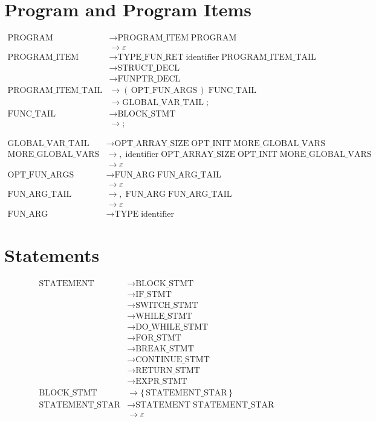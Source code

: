 
\section{Program and Program Items}
\begin{align*}
\text{PROGRAM}
  &\to \text{PROGRAM\_ITEM}\;\text{PROGRAM}\\
  &\to \varepsilon\\[6pt]
\text{PROGRAM\_ITEM}
  &\to \text{TYPE\_FUN\_RET}\;\text{identifier}\;\text{PROGRAM\_ITEM\_TAIL}\\
  &\to \text{STRUCT\_DECL}\\
  &\to \text{FUNPTR\_DECL}\\[6pt]
\text{PROGRAM\_ITEM\_TAIL}
  &\to (\,\text{OPT\_FUN\_ARGS}\,)\;\text{FUNC\_TAIL}\\
  &\to \text{GLOBAL\_VAR\_TAIL}\; ;\\[6pt]
\text{FUNC\_TAIL}
  &\to \text{BLOCK\_STMT}\\
  &\to ;
\end{align*}

\begin{align*}
\text{GLOBAL\_VAR\_TAIL}
  &\to \text{OPT\_ARRAY\_SIZE}\;\text{OPT\_INIT}\;\text{MORE\_GLOBAL\_VARS}\\[6pt]
\text{MORE\_GLOBAL\_VARS}
  &\to ,\;\text{identifier}\;\text{OPT\_ARRAY\_SIZE}\;\text{OPT\_INIT}\;\text{MORE\_GLOBAL\_VARS}\\
  &\to \varepsilon\\[6pt]
\text{OPT\_FUN\_ARGS}
  &\to \text{FUN\_ARG}\;\text{FUN\_ARG\_TAIL}\\
  &\to \varepsilon\\[6pt]
\text{FUN\_ARG\_TAIL}
  &\to ,\;\text{FUN\_ARG}\;\text{FUN\_ARG\_TAIL}\\
  &\to \varepsilon\\[6pt]
\text{FUN\_ARG}
  &\to \text{TYPE}\;\text{identifier}
\end{align*}

\section{Statements}
\begin{align*}
\text{STATEMENT}
  &\to \text{BLOCK\_STMT}\\
  &\to \text{IF\_STMT}\\
  &\to \text{SWITCH\_STMT}\\
  &\to \text{WHILE\_STMT}\\
  &\to \text{DO\_WHILE\_STMT}\\
  &\to \text{FOR\_STMT}\\
  &\to \text{BREAK\_STMT}\\
  &\to \text{CONTINUE\_STMT}\\
  &\to \text{RETURN\_STMT}\\
  &\to \text{EXPR\_STMT}\\[6pt]
\text{BLOCK\_STMT}
  &\to \{\,\text{STATEMENT\_STAR}\,\}\\[6pt]
\text{STATEMENT\_STAR}
  &\to \text{STATEMENT}\;\text{STATEMENT\_STAR}\\
  &\to \varepsilon
\end{align*}


